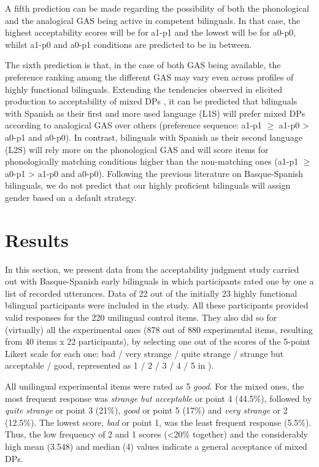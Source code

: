 \documentclass[output=paper]{langscibook}
\begin{document}
A fifth prediction can be made regarding the possibility of both the phonological and the analogical GAS being active in competent bilinguals. In that case, the highest acceptability scores will be for a1-p1 and the lowest will be for a0-p0, whilst a1-p0 and a0-p1 conditions are predicted to be in between.

The sixth prediction is that, in the case of both GAS being available, the preference ranking among the different GAS may vary even across profiles of highly functional bilinguals. Extending the tendencies observed in elicited production to acceptability of mixed DPs \citep{Munarriz-IbarrolaEtAl2022}, it can be predicted that bilinguals with Spanish as their first and more used language (L1S) will  prefer mixed DPs according to analogical GAS over others (preference sequence: a1-p1 ${\geq}$ a1-p0 > a0-p1 and a0-p0). In contrast, bilinguals with Spanish as their second language (L2S) will rely more on the phonological GAS and will score items for phonologically matching conditions higher than the non-matching ones (a1-p1  ${\geq}$ a0-p1 > a1-p0 and a0-p0). Following the previous literature on Basque-Spanish bilinguals, we do not predict that our highly proficient bilinguals will assign gender based on a default strategy.

\section{Results}\label{sec:ezeiza:4}

In this section, we present data from the acceptability judgment study carried out with Basque-Spanish early bilinguals in which participants rated one by one a list of recorded utterances. Data of 22 out of the initially 23 highly functional bilingual participants were included in the study. All these participants provided valid responses for the 220 unilingual control items. They also did so for (virtually) all the experimental ones (878 out of 880 experimental items, resulting from 40 items x 22 participants), by selecting one out of the scores of the 5-point Likert scale for each one: bad / very strange / quite strange / strange but acceptable / good, represented as 1 / 2 / 3 / 4 / 5 in ).

All unilingual experimental items were rated as 5 \textit{good}. For the mixed ones, the most frequent response was \textit{strange but acceptable} or point 4 (44.5\%), followed by \textit{quite strange} or point 3 (21\%), \textit{good} or point 5 (17\%) and \textit{very strange} or  2 (12.5\%). The lowest score, \textit{bad} or point 1, was the least frequent response (5.5\%). Thus, the low frequency of 2 and 1 scores (<20\% together) and the considerably high mean (3.548) and median (4) values indicate a general acceptance of mixed DPs.
\end{document}
